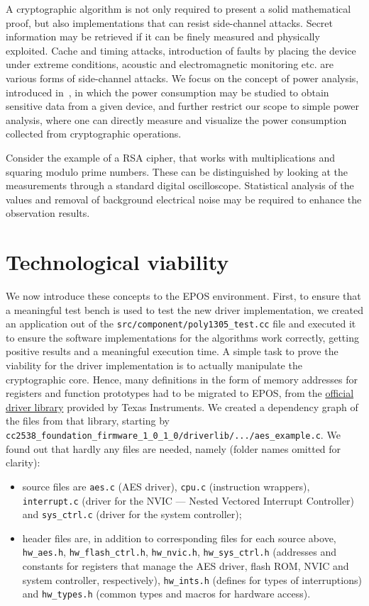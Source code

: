 \documentclass{../sftex/sftex}
\begin{document}
A cryptographic algorithm is not only required to present a solid mathematical
proof, but also implementations that can resist side-channel attacks. Secret
information may be retrieved if it can be finely measured and physically
exploited. Cache and timing attacks, introduction of faults by placing the
device under extreme conditions, acoustic and electromagnetic monitoring etc.
are various forms of side-channel attacks. We focus on the concept of power
analysis, introduced in~\cite{Kocher:inproc:1999:aug}, in which the power
consumption may be studied to obtain sensitive data from a given device, and
further restrict our scope to simple power analysis, where one can directly
measure and visualize the power consumption collected from cryptographic
operations.

Consider the example of a RSA cipher, that works with multiplications and
squaring modulo prime numbers. These can be distinguished by looking at the
measurements through a standard digital oscilloscope. Statistical analysis of
the values and removal of background electrical noise may be required to
enhance the observation results.

\section{Technological viability}

We now introduce these concepts to the EPOS environment. First, to ensure that
a meaningful test bench is used to test the new driver implementation, we
created an application out of the \verb!src/component/poly1305_test.cc! file
and executed it to ensure the software implementations for the algorithms work
correctly, getting positive results and a meaningful execution time. A simple
task to prove the viability for the driver implementation is to actually
manipulate the cryptographic core. Hence, many definitions in the form of
memory addresses for registers and function prototypes had to be migrated to
EPOS, from the \href{http://www.ti.com/tool/CC2538-SW}{official driver library}
provided by Texas Instruments. We created a dependency graph of the files from
that library, starting by
\verb!cc2538_foundation_firmware_1_0_1_0/driverlib/.../aes_example.c!. We found
out that hardly any files are needed, namely (folder names omitted for
clarity):

\begin{itemize}
  \item source files are \verb!aes.c! (AES driver), \verb!cpu.c! (instruction
      wrappers), \verb!interrupt.c! (driver for the NVIC --- Nested Vectored
        Interrupt Controller) and \verb!sys_ctrl.c! (driver for the system
        controller);
  \item header files are, in addition to corresponding files for each source
      above, \verb!hw_aes.h!, \verb!hw_flash_ctrl.h!, \verb!hw_nvic.h!,
        \verb!hw_sys_ctrl.h! (addresses and constants for registers that manage
        the AES driver, flash ROM, NVIC and system controller, respectively),
        \verb!hw_ints.h! (defines for types of interruptions) and
        \verb!hw_types.h! (common types and macros for hardware access).
\end{itemize}
\end{document}
